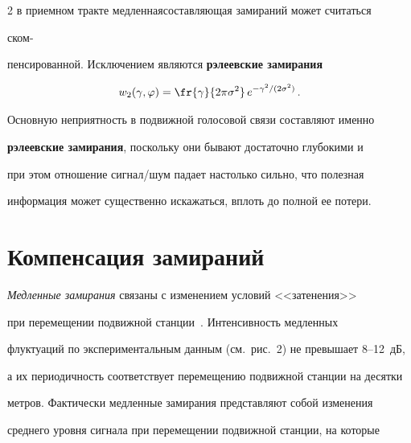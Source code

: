 \begin{multicols}{2}
в приемном тракте медленная\linebreak со\-став\-ля\-ющая замираний может считаться 


ском-\linebreak\vspace*{-12pt}


\columnbreak





\noindent


пенсированной. Исключением являются \textbf{рэлеевские замирания}


     \begin{equation}


     w_2(\gamma,\varphi)=\fr{\gamma}{2\pi \sigma^2}\,e^{-


\gamma^2/(2\sigma^2)}\,.


     \label{e1-pr}


     \end{equation}


Основную неприятность в подвижной голосовой связи составляют именно 


\textbf{рэлеевские замирания}, поскольку они бывают достаточно глубокими и 


при этом отношение сиг\-нал/шум падает настолько сильно, что полезная 


информация может существенно искажаться, вплоть до полной ее потери.





\section{Компенсация замираний}


     


     \textit{Медленные замирания} связаны с изменением условий <<затенения>> 


при перемещении подвижной станции~\cite{3-pr, 4-pr}. Интенсивность медленных 


флуктуаций по экспериментальным данным (см.\ рис.~2) не превышает 8--12~дБ, 


а их периодичность соответствует перемещению подвижной станции на десятки 


метров. Фактически медленные замирания представляют собой изменения 


среднего уровня сигнала при перемещении подвижной станции, на которые 



\end{multicols}
